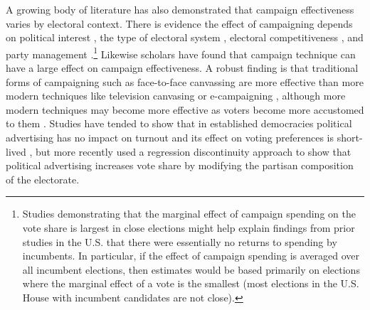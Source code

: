 \documentclass[12pt,final,fleqn]{article}
\theoremstyle{plain}
\begin{document}
A growing body of literature has also demonstrated that campaign effectiveness varies by electoral context. There is evidence the effect of campaigning depends on political interest \citep{arceneaux2009mobilized, hillygus2005campaign, imai2011estimation, niven2001limits}, the type of electoral system \citep{karp2007getting}, electoral competitiveness \citep{fieldhouse2009effectiveness, gerber2004does}, and party management \citep{fisher2006relative, fisher2011electoral}.\footnote{Studies demonstrating that the marginal effect of campaign spending on the vote share is largest in close elections might help explain findings from prior studies in the U.S. that there were essentially no returns to spending by incumbents. In particular, if the effect of campaign spending is averaged over all incumbent elections, then estimates would be based primarily on elections where the marginal effect of a vote is the smallest (most elections in the U.S. House with incumbent candidates are not close).} Likewise scholars have found that campaign technique can have a large effect on campaign effectiveness. A robust finding is that traditional forms of campaigning such as face-to-face canvassing are more effective than more modern techniques like television canvasing or e-campaigning  \citep{aldrich2016getting, arceneaux2009mobilized, fisher2009evaluating, fisher2016all, gerber2000effects, imai2013estimating, pattie2003hanging}, although more modern techniques may become more effective as voters become more accustomed to them \citep{fisher2009evaluating, imai2005get, fisher2016all}. Studies have tended to show that in established democracies political advertising has no impact on turnout \citep{ashworth2007does, krasno2008televised} and its effect on voting preferences is short-lived \citep{ gerber2011large}, but more recently \citet{spenkuch2018political} used a regression discontinuity approach to show that political advertising increases vote share by modifying the partisan composition of the electorate.
  
\end{document}

